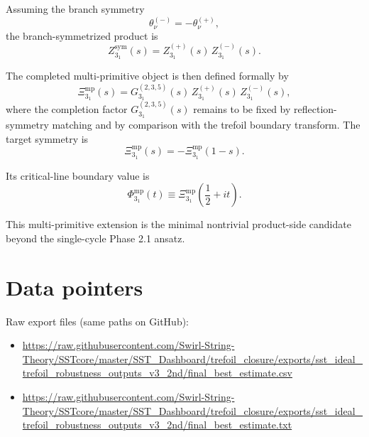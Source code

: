 \documentclass[11pt]{article}
\begin{document}
    Assuming the branch symmetry
    \[
        \theta_\nu^{(-)}=-\theta_\nu^{(+)},
    \]
    the branch-symmetrized product is
    \begin{equation}
        Z_{3_1}^{\mathrm{sym}}(s)
        =
        Z_{3_1}^{(+)}(s)\,Z_{3_1}^{(-)}(s).
    \end{equation}
    
    The completed multi-primitive object is then defined formally by
    \begin{equation}
        \Xi_{3_1}^{\mathrm{mp}}(s)
        =
        G_{3_1}^{(2,3,5)}(s)\,
        Z_{3_1}^{(+)}(s)\,
        Z_{3_1}^{(-)}(s),
    \end{equation}
    where the completion factor \(G_{3_1}^{(2,3,5)}(s)\) remains to be fixed by reflection-symmetry matching and by comparison with the trefoil boundary transform. The target symmetry is
    \begin{equation}
        \Xi_{3_1}^{\mathrm{mp}}(s)=-\Xi_{3_1}^{\mathrm{mp}}(1-s).
    \end{equation}
    
    Its critical-line boundary value is
    \begin{equation}
        \Phi_{3_1}^{\mathrm{mp}}(t)
        \equiv
        \Xi_{3_1}^{\mathrm{mp}}\!\left(\frac12+it\right).
    \end{equation}
    
    This multi-primitive extension is the minimal nontrivial product-side candidate beyond the single-cycle
    Phase 2.1 ansatz.
    
\section*{Data pointers}

Raw export files (same paths on GitHub):
\begingroup
\sloppy
\begin{itemize}
    \item \url{https://raw.githubusercontent.com/Swirl-String-Theory/SSTcore/master/SST_Dashboard/trefoil_closure/exports/sst_ideal_trefoil_robustness_outputs_v3_2nd/final_best_estimate.csv}
    \item \url{https://raw.githubusercontent.com/Swirl-String-Theory/SSTcore/master/SST_Dashboard/trefoil_closure/exports/sst_ideal_trefoil_robustness_outputs_v3_2nd/final_best_estimate.txt}
\end{itemize}
\fussy
\endgroup
\end{document}

